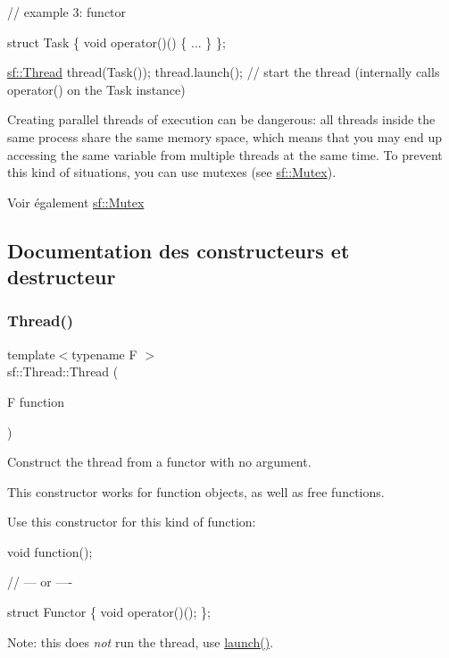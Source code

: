 \begin{DoxyCode}
\textcolor{comment}{// example 3: functor}

\textcolor{keyword}{struct }Task
\{
    \textcolor{keywordtype}{void} operator()()
    \{
        ...
    \}
\};

\hyperlink{classsf_1_1Thread}{sf::Thread} thread(Task());
thread.launch(); \textcolor{comment}{// start the thread (internally calls operator() on the Task instance)}
\end{DoxyCode}


Creating parallel threads of execution can be dangerous\+: all threads inside the same process share the same memory space, which means that you may end up accessing the same variable from multiple threads at the same time. To prevent this kind of situations, you can use mutexes (see \hyperlink{classsf_1_1Mutex}{sf\+::\+Mutex}).

\begin{DoxySeeAlso}{Voir également}
\hyperlink{classsf_1_1Mutex}{sf\+::\+Mutex} 
\end{DoxySeeAlso}


\subsection{Documentation des constructeurs et destructeur}
\mbox{\label{classsf_1_1Thread_a4cc65399bbb111cf8132537783b8e96c}} 
\subsubsection{\texorpdfstring{Thread()}{Thread()}\hspace{0.1cm}{\footnotesize\ttfamily [1/3]}}
{\footnotesize\ttfamily template$<$typename F $>$ \\
sf\+::\+Thread\+::\+Thread (\begin{DoxyParamCaption}\item[{F}]{function }\end{DoxyParamCaption})}



Construct the thread from a functor with no argument. 

This constructor works for function objects, as well as free functions.

Use this constructor for this kind of function\+: 
\begin{DoxyCode}
\textcolor{keywordtype}{void} \textcolor{keyword}{function}();

\textcolor{comment}{// --- or ----}

\textcolor{keyword}{struct }Functor
\{
    \textcolor{keywordtype}{void} operator()();
\};
\end{DoxyCode}
 Note\+: this does {\itshape not} run the thread, use \hyperlink{classsf_1_1Thread_a74f75a9e86e1eb47479496314048b5f6}{launch()}.


